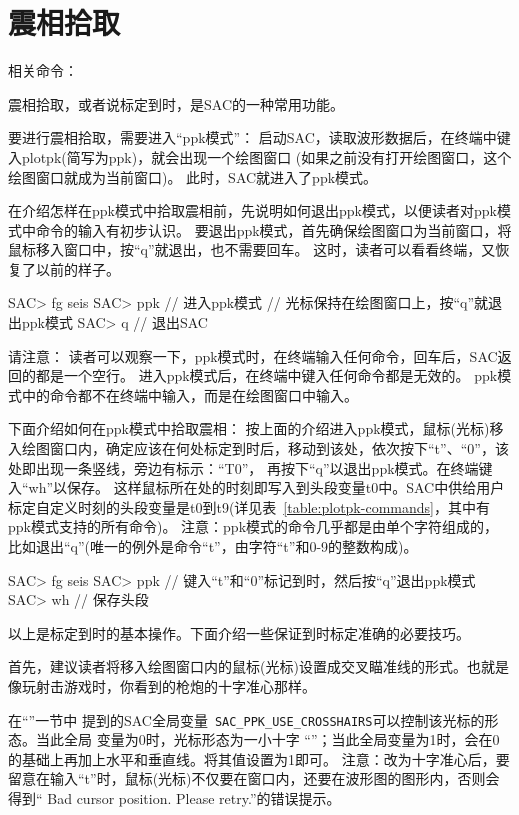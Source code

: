 \section{震相拾取}%
\label{sec:phase-picking}
相关命令：

震相拾取，或者说标定到时，是SAC的一种常用功能。

要进行震相拾取，需要进入``ppk模式''：
启动SAC，读取波形数据后，在终端中键入plotpk(简写为ppk)，就会出现一个绘图窗口
(如果之前没有打开绘图窗口，这个绘图窗口就成为当前窗口)。
此时，SAC就进入了ppk模式。

在介绍怎样在ppk模式中拾取震相前，先说明如何退出ppk模式，以便读者对ppk模式中命令的输入有初步认识。
要退出ppk模式，首先确保绘图窗口为当前窗口，将鼠标移入窗口中，按``q''就退出，也不需要回车。
这时，读者可以看看终端，又恢复了以前的样子。

\begin{SACCode}
SAC> fg seis
SAC> ppk        // 进入ppk模式
// 光标保持在绘图窗口上，按``q''就退出ppk模式
SAC> q          // 退出SAC
\end{SACCode}

请注意：
读者可以观察一下，ppk模式时，在终端输入任何命令，回车后，SAC返回的都是一个空行。
进入ppk模式后，在终端中键入任何命令都是无效的。
ppk模式中的命令都不在终端中输入，而是在绘图窗口中输入。

下面介绍如何在ppk模式中拾取震相：
按上面的介绍进入ppk模式，鼠标(光标)移入绘图窗口内，确定应该在何处标定到时后，移动到该处，依次按下``t''、``0''，该处即出现一条竖线，旁边有标示：``T0''，
再按下``q''以退出ppk模式。在终端键入``wh''以保存。
这样鼠标所在处的时刻即写入到头段变量t0中。SAC中供给用户标定自定义时刻的头段变量是t0到t9(详见表~\ref{table:plotpk-commands}，其中有ppk模式支持的所有命令)。
注意：ppk模式的命令几乎都是由单个字符组成的，比如退出``q''(唯一的例外是命令``t''，由字符``t''和0-9的整数构成)。

\begin{SACCode}
SAC> fg seis
SAC> ppk
// 键入``t''和``0''标记到时，然后按``q''退出ppk模式
SAC> wh         // 保存头段
\end{SACCode}
以上是标定到时的基本操作。下面介绍一些保证到时标定准确的必要技巧。

首先，建议读者将移入绘图窗口内的鼠标(光标)设置成交叉瞄准线的形式。也就是像玩射击游戏时，你看到的枪炮的十字准心那样。

在``''一节中
提到的SAC全局变量~\verb+SAC_PPK_USE_CROSSHAIRS+可以控制该光标的形态。当此全局
变量为0时，光标形态为一小十字
``''；当此全局变量为1时，会在0的基础上再加上水平和垂直线。将其值设置为1即可。
注意：改为十字准心后，要留意在输入``t''时，鼠标(光标)不仅要在窗口内，还要在波形图的图形内，否则会得到`` Bad cursor position. Please retry.''的错误提示。

